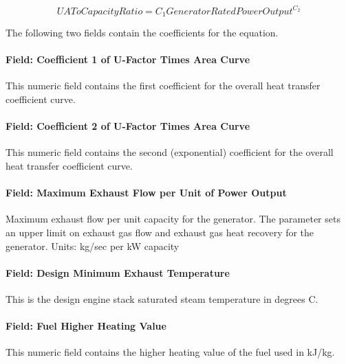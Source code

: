 \begin{equation}
UAToCapacityRatio = {C_1}GeneratorRatedPowerOutpu{t^{{C_2}}}
\end{equation}

The following two fields contain the coefficients for the equation.

\paragraph{Field: Coefficient 1 of U-Factor Times Area Curve}\label{field-coefficient-1-of-u-factor-times-area-curve}

This numeric field contains the first coefficient for the overall heat transfer coefficient curve.

\paragraph{Field: Coefficient 2 of U-Factor Times Area Curve}\label{field-coefficient-2-of-u-factor-times-area-curve}

This numeric field contains the second (exponential) coefficient for the overall heat transfer coefficient curve.

\paragraph{Field: Maximum Exhaust Flow per Unit of Power Output}\label{field-maximum-exhaust-flow-per-unit-of-power-output}

Maximum exhaust flow per unit capacity for the generator. The parameter sets an upper limit on exhaust gas flow and exhaust gas heat recovery for the generator. Units: kg/sec per kW capacity

\paragraph{Field: Design Minimum Exhaust Temperature}\label{field-design-minimum-exhaust-temperature}

This is the design engine stack saturated steam temperature in degrees C.

\paragraph{Field: Fuel Higher Heating Value}\label{field-fuel-higher-heating-value}

This numeric field contains the higher heating value of the fuel used in kJ/kg.


